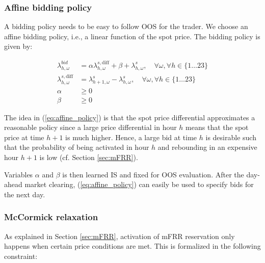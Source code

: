 \subsubsection{Affine bidding policy}

A bidding policy needs to be easy to follow OOS for the trader. We choose an affine bidding policy, i.e., a linear function of the spot price. The bidding policy is given by:

\begin{subequations}\label{eq:affine_policy}
    \begin{align}
        \lambda^{bid}_{h,\omega}           & = \alpha \lambda_{h,\omega}^{s,\text{diff}} + \beta + \lambda_{h,\omega}^{s}, \quad \forall{\omega}, \forall{h} \in \{1\ldots23\}\label{affine_policy:1} \\
        \lambda_{h,\omega}^{s,\text{diff}} & = \lambda_{h+1,\omega}^{s} - \lambda_{h,\omega}^{s}, \quad \forall{\omega}, \forall{h} \in \{1\ldots23\}\label{affine_policy:1_2}                        \\
        \alpha                             & \geq 0\label{affine_policy:2}                                                                                                                            \\
        \beta                              & \geq 0\label{affine_policy:3}
    \end{align}
\end{subequations}

The idea in (\ref{eq:affine_policy}) is that the spot price differential approximates a reasonable policy since a large price differential in hour $h$ means that the spot price at time $h+1$ is much higher. Hence, a large bid at time $h$ is desirable such that the probability of being activated in hour $h$ and rebounding in an expensive hour $h+1$ is low (cf. Section \ref{sec:mFRR}).

Variables $\alpha$ and $\beta$ is then learned IS and fixed for OOS evaluation. After the day-ahead market clearing, (\ref{eq:affine_policy}) can easily be used to specify bids for the next day.

\subsubsection{McCormick relaxation}\label{sec:mccormick}

As explained in Section \ref{sec:mFRR}, activation of mFRR reservation only happens when certain price conditions are met. This is formalized in the following constraint:

